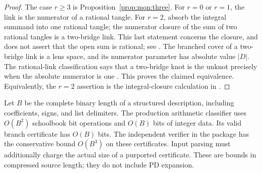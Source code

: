 \begin{proof}
The case $r\ge3$ is Proposition~\ref{prop:mon:three}.
For $r=0$ or $r=1$, the link is the numerator of a rational tangle.
For $r=2$, absorb the integral summand into one rational tangle; the numerator
closure of the sum of two rational tangles is a two-bridge link.  This last
statement concerns the closure, and does not assert that the open sum is
rational; see \cite[Section~2]{kauffman-lambropoulou-tangles}.
The branched cover of a two-bridge link is a lens space, and its numerator
parameter has absolute value $|D|$.  The rational-link classification says
that a two-bridge knot is the unknot precisely when the absolute numerator
is one \cite{kauffman-lambropoulou-knots}.  This proves the claimed equivalence.
Equivalently, the $r=2$ assertion is the integral-closure calculation in
\cite[Theorem~4.9]{nogueira-salgueiro}.
\end{proof}

\begin{proposition}
\label{prop:mon:complexity}
Let $B$ be the complete binary length of a structured description, including
coefficients, signs, and list delimiters. The production arithmetic classifier
uses $O(B^2)$ schoolbook bit operations and $O(B)$ bits of integer data.
Its valid branch certificate has $O(B)$ bits. The independent verifier in the
package has the conservative bound $O(B^3)$ on these certificates. Input
parsing must additionally charge the actual size of a purported certificate.
These are bounds in compressed source length; they do not include PD expansion.
\end{proposition}

